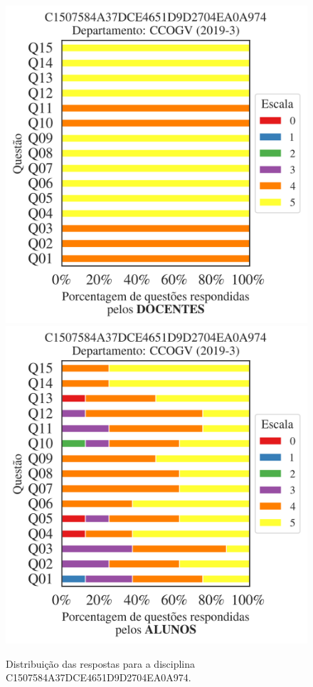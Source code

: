 \documentclass[a4paper,10pt]{article}
\begin{document}
\begin{figure}[h]
\centering
\includegraphics[width=0.485\linewidth]{analise_disciplina_departamento_CCOGV_C1507584A37DCE4651D9D2704EA0A974_docentes.png}
\includegraphics[width=0.485\linewidth]{analise_disciplina_departamento_CCOGV_C1507584A37DCE4651D9D2704EA0A974_alunos.png}
\caption{\label{fig:analise_geral_departamento}                Distribuição das respostas para a disciplina C1507584A37DCE4651D9D2704EA0A974. }
\end{figure}
\end{document}

